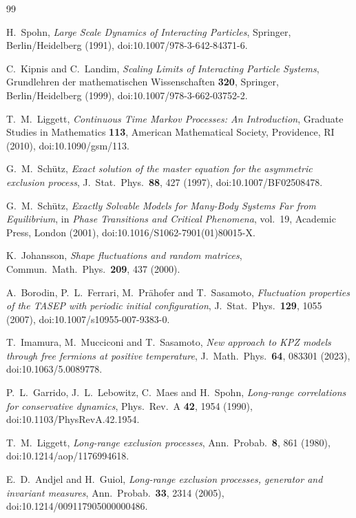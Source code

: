 \documentclass[11pt]{article}
\numberwithin{equation}{section}
\newcommand{\1}{\mathbf 1}
\begin{document}
\begin{thebibliography}{99}

H.~Spohn,
\emph{Large Scale Dynamics of Interacting Particles},
Springer, Berlin/Heidelberg (1991),
doi:10.1007/978-3-642-84371-6.

C.~Kipnis and C.~Landim,
\emph{Scaling Limits of Interacting Particle Systems},
Grundlehren der mathematischen Wissenschaften \textbf{320}, Springer,
Berlin/Heidelberg (1999),
doi:10.1007/978-3-662-03752-2.

T.~M.~Liggett,
\emph{Continuous Time Markov Processes: An Introduction},
Graduate Studies in Mathematics \textbf{113}, American Mathematical Society,
Providence, RI (2010),
doi:10.1090/gsm/113.

G.~M.~Sch\"utz,
\emph{Exact solution of the master equation for the asymmetric exclusion
process},
J.~Stat.~Phys.~\textbf{88}, 427 (1997),
doi:10.1007/BF02508478.

G.~M.~Sch\"utz,
\emph{Exactly Solvable Models for Many-Body Systems Far from Equilibrium},
in \emph{Phase Transitions and Critical Phenomena}, vol.~19, Academic Press,
London (2001),
doi:10.1016/S1062-7901(01)80015-X.

K.~Johansson,
\emph{Shape fluctuations and random matrices},
Commun.~Math.~Phys.~\textbf{209}, 437 (2000).

A.~Borodin, P.~L.~Ferrari, M.~Pr\"ahofer and T.~Sasamoto,
\emph{Fluctuation properties of the TASEP with periodic initial configuration},
J.~Stat.~Phys.~\textbf{129}, 1055 (2007),
doi:10.1007/s10955-007-9383-0.

T.~Imamura, M.~Mucciconi and T.~Sasamoto,
\emph{New approach to KPZ models through free fermions at positive temperature},
J.~Math.~Phys.~\textbf{64}, 083301 (2023),
doi:10.1063/5.0089778.

P.~L.~Garrido, J.~L.~Lebowitz, C.~Maes and H.~Spohn,
\emph{Long-range correlations for conservative dynamics},
Phys.~Rev.~A \textbf{42}, 1954 (1990),
doi:10.1103/PhysRevA.42.1954.

T.~M.~Liggett,
\emph{Long-range exclusion processes},
Ann.~Probab.~\textbf{8}, 861 (1980),
doi:10.1214/aop/1176994618.

E.~D.~Andjel and H.~Guiol,
\emph{Long-range exclusion processes, generator and invariant measures},
Ann.~Probab.~\textbf{33}, 2314 (2005),
doi:10.1214/009117905000000486.


\end{thebibliography}
\end{document}

